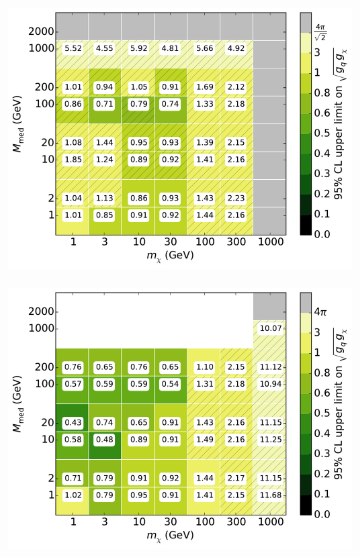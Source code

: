 \begin{figure}[h]
  \centering
    \begin{subfigure}[t]{0.495\textwidth}
      \centering
      \includegraphics[width=1.\textwidth]{figures/grid_allpoints_SVD_rat05.pdf}
    \end{subfigure}
    \begin{subfigure}[t]{0.495\textwidth}
      \centering
      \includegraphics[width=1.\textwidth]{figures/grid_allpoints_SVD_rat1.pdf}
    \end{subfigure}
    \begin{subfigure}[t]{0.495\textwidth}
      \centering

\end{subfigure}
\end{figure}
